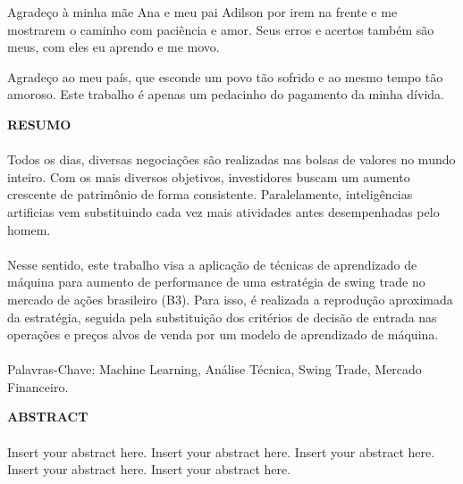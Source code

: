 Agrade\c{c}o \`a minha m\~ae Ana e meu pai Adilson por irem na frente e me mostrarem o caminho com paci\^encia e amor.
Seus erros e acertos tamb\'em s\~ao meus, com eles eu aprendo e me movo.

Agrade\c{c}o ao meu pa\'is, que esconde um povo t\~ao sofrido e ao mesmo tempo t\~ao amoroso. Este trabalho é apenas um pedacinho do pagamento da minha d\'ivida.


\pagebreak


\begin{center}
\textbf{RESUMO}
\end{center}
      \vspace{0.5cm}

\paragraph{} Todos os dias, diversas negociações são realizadas nas bolsas de valores no mundo inteiro. Com os mais diversos objetivos, investidores buscam um aumento crescente de patrimônio de forma consistente. Paralelamente, inteligências artificias vem substituindo cada vez mais atividades antes desempenhadas pelo homem.

\paragraph{} Nesse sentido, este trabalho visa a aplicação de técnicas de aprendizado de máquina para aumento de performance de uma estratégia de swing trade no mercado de ações brasileiro (B3). Para isso, é realizada a reprodução aproximada da estratégia, seguida pela substituição dos critérios de decisão de entrada nas operações e preços alvos de venda por um modelo de aprendizado de máquina.

\paragraph{}
\noindent Palavras-Chave: Machine Learning, Análise Técnica, Swing Trade, Mercado Financeiro.

\pagebreak


\begin{center}
\textbf{ABSTRACT}
\end{center}
      \vspace{0.5cm}

\paragraph{}Insert your abstract here. Insert your abstract here. Insert your abstract here. Insert your abstract here. Insert your abstract here.
